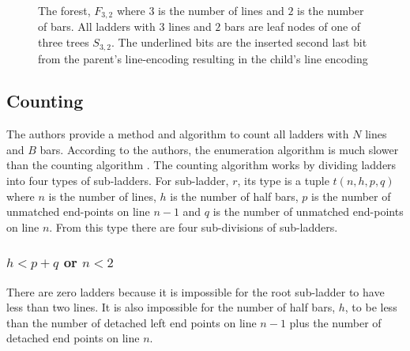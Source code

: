 \begin{figure}[!htp]
\begin{center}
\begin{minipage}{0.8\textwidth}
        \end{minipage}
    \end{center}
    \caption{The forest, $F_{3,2}$ where $3$ is the number of lines and $2$ is the number of bars. All ladders with $3$ lines and $2$ bars are leaf nodes of one of three trees $S_{3,2}$.
    The underlined bits are the inserted second last bit from the parent's line-encoding resulting in the child's line encoding}
    \label{fig:forest3,2}
\end{figure}


\subsection{Counting}
The authors provide a method and algorithm to count all ladders 
with $N$ lines and $B$ bars. According to the authors, the enumeration algorithm is 
much slower than the counting algorithm \cite{A6}. The counting algorithm 
works by dividing ladders into four types of sub-ladders.
For sub-ladder, $r$, its type is a tuple $t(n,h,p,q)$ where 
$n$ is the number of lines, $h$ is the number of half bars, 
$p$ is the number of unmatched end-points on line $n-1$ and 
$q$ is the number of unmatched end-points on line $n$. From this 
type there are four sub-divisions of sub-ladders.\cite{A6}
\subsubsection{ $h < p+q$ or $n<2$}
There are zero ladders because it is impossible for the 
root sub-ladder to have less than two lines. It is also 
impossible for the number of half bars, $h$, to 
be less than the number of detached left end points 
on line $n-1$ plus the number of detached end points on 
line $n$.

